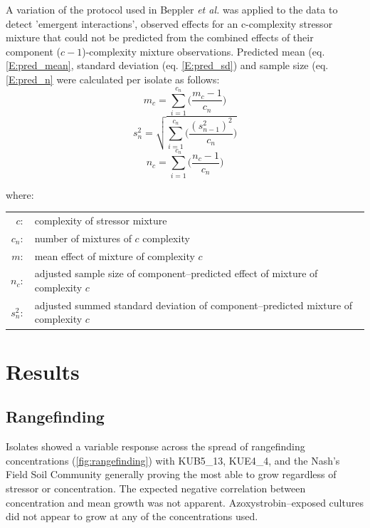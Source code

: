 \documentclass[final,1p,times]{elsarticle}
\begin{document}
A variation of the protocol used in Beppler \textit{et al.} \cite{Beppler2016} was applied to the data to detect 'emergent interactions', observed effects for an c-complexity stressor mixture that could not be predicted from the combined effects of their component ($c-1$)-complexity mixture observations. Predicted mean (eq. \ref{E:pred_mean}, standard deviation (eq. \ref{E:pred_sd}) and sample size (eq. \ref{E:pred_n} were calculated per isolate as follows: 
\begin{equation}[ht]
    m_c = \sum_{i = 1}^{c_n}\Big(\frac{m_c-1}{c_n}\Big)
\label{E:pred_mean}    
\end{equation}
\begin{equation}
    s^2_n = \sqrt{\sum_{i = 1}^{c_n}\bigg(\frac{(s^2_{n-1})^2}{c_n}\bigg)}
\label{E:pred_sd}    
\end{equation}
\begin{equation}
    n_c = \sum_{i = 1}^{c_n}\Big(\frac{n_c-1}{c_n}\Big)
\label{E:pred_n}    
\end{equation}

\mbox{where:}

\begin{small}
\setlength{\tabcolsep}{1pt}
\begin{tabular}{r p{11cm}}
    $c :$ & complexity of stressor mixture \\
    $c_n :$ & number of mixtures of $c$ complexity \\
    $m :$ & mean effect of mixture of complexity $c$ \\
    $n_c :$ & adjusted sample size of component--predicted effect of mixture of complexity $c$ \\
    $s^2_n :$ & adjusted summed standard deviation of component--predicted mixture of complexity $c$ \\
\end{tabular}
\end{small}

\section{Results}
\label{S:3}

\subsection{Rangefinding}
\label{S:3:1}

Isolates showed a variable response across the spread of rangefinding concentrations (\cref{fig:rangefinding}) with KUB5\_13, KUE4\_4, and the Nash's Field Soil Community generally proving the most able to grow regardless of stressor or concentration. The expected negative correlation between concentration and mean growth was not apparent. Azoxystrobin--exposed cultures did not appear to grow at any of the concentrations used.
\end{document}
